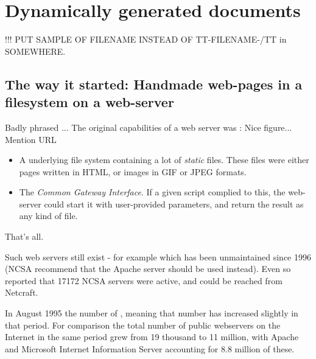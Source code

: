 

\chapter{Dynamically generated documents}
\label{cha:dynamically-generated-documents}


!!! PUT SAMPLE OF FILENAME INSTEAD OF TT-FILENAME-/TT in SOMEWHERE.


\section{The way it started: Handmade web-pages in a filesystem on a web-server}

\textsf{Badly phrased ...}  The original capabilities of a web server
was : \textsf{Nice figure... Mention URL}

\begin{itemize}
\item A underlying file system containing a lot of \textit{static}
files.  These files were either pages written in HTML, or images in
GIF or JPEG formats.

\item The \textit{Common Gateway Interface}.  If a given script
complied to this, the web-server could start it with user-provided
parameters, and return the result as any kind of file.
\end{itemize}

That's all.  

Such web servers still exist - for example
 which has been
unmaintained since 1996 (NCSA recommend that the Apache server should
be used instead).  Even so
 reported that \textsf{17172} NCSA servers were
active, and could be reached from Netcraft.

In August 1995 the number of
, meaning that number has increased slightly
in that period.  For comparison the total number of public webservers
on the Internet in the same period grew from 19 thousand to 11
million, with Apache and Microsoft Internet Information Server
accounting for 8.8 million of these.

